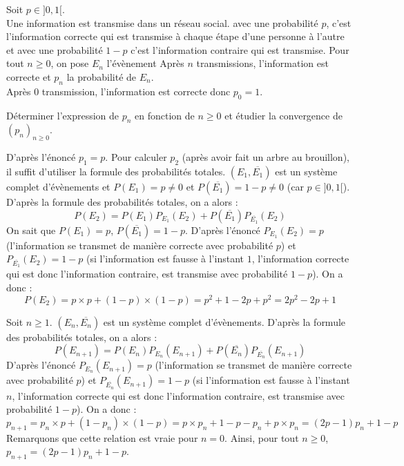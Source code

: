 \documentclass[a4paper,10pt]{report}
\begin{document}
\begin{Exa} Soit $p \in ]0,1[$. \\
Une information est transmise dans un réseau social. avec une probabilité $p$, c'est l'information correcte qui est transmise à chaque étape d'une personne à l'autre et avec une probabilité $1-p$ c'est l'information contraire qui est transmise. Pour tout $n \geq 0$, on pose $E_n$ l'évènement \og Après $n$ transmissions, l'information est correcte \fg et $p_n$ la probabilité de $E_n$. \\
\noindent Après 0 transmission, l'information est correcte donc $p_0=1$.

\medskip Déterminer l'expression de $p_n$ en fonction de $n \geq 0$ et étudier la convergence de $(p_n)_{n \geq 0}$.
\end{Exa}

\corr D'après l'énoncé $p_1=p$. Pour calculer $p_2$ (après avoir fait un arbre au brouillon), il suffit d'utiliser la formule des probabilités totales. $(E_1, \overline{E_1})$ est un système complet d'évènements et $P(E_1)=p \neq 0$ et $P(\overline{E_1})=1-p \neq 0$ (car $p \in ]0,1[$). D'après la formule des probabilités totales, on a alors :
\[ P(E_2)=P(E_1)P_{E_1}(E_2) + P( \overline{E_1}) P_{\overline{E_1}}(E_2) \]
On sait que $P(E_1)=p$, $P(\overline{E_1})=1-p$. D'après l'énoncé $P_{E_1}(E_2)=p$ (l'information se transmet de manière correcte avec probabilité $p$) et $P_{\overline{E_1}}(E_2)=1-p$ (si l'information est fausse à l'instant $1$, l'information correcte qui est donc l'information contraire, est transmise avec probabilité $1-p$). On a donc :
\[ P(E_2)= p\times p + (1-p)\times (1-p) = p^2 + 1 -2p+p^2 = 2p^2-2p+1\]

\medskip

\noindent Soit $n \geq 1$. $(E_n, \overline{E_n})$ est un système complet d'évènements. D'après la formule des probabilités totales, on a alors :
\[ P(E_{n+1})=P(E_n)P_{E_n}(E_{n+1}) + P( \overline{E_n}) P_{\overline{E_n}}(E_{n+1}) \]
D'après l'énoncé $P_{E_n}(E_{n+1})=p$ (l'information se transmet de manière correcte avec probabilité $p$) et $P_{\overline{E_n}}(E_{n+1})=1-p$ (si l'information est fausse à l'instant $n$, l'information correcte qui est donc l'information contraire, est transmise avec probabilité $1-p$). On a donc :
\[ p_{n+1} = p_n \times p + (1-p_n)\times (1-p) = p \times p_n + 1 -p -p_n+ p \times p_n = (2p-1)p_n + 1-p \]
Remarquons que cette relation est vraie pour $n=0$. Ainsi, pour tout $n \geq 0$, $p_{n+1}=(2p-1)p_n+1-p$.

\medskip
\end{document}
